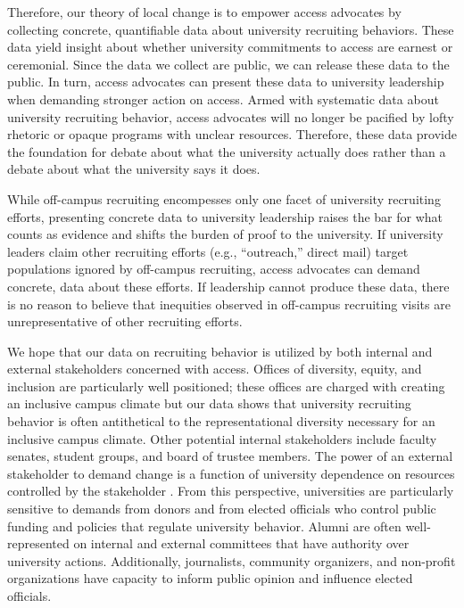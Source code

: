 \documentclass[twoside]{article}
\begin{document}
Therefore, our theory of local change is to empower access advocates by collecting concrete, quantifiable data about university recruiting behaviors. These data yield insight about whether university commitments to access are earnest or ceremonial.  Since the data we collect are public, we can release these data to the public. In turn, access advocates can present these data to university leadership when demanding stronger action on access.  Armed with systematic data about university recruiting behavior, access advocates will no longer be pacified by lofty rhetoric or opaque programs with unclear resources.  Therefore, these data provide the foundation for debate about what the university actually does rather than a debate about what the university says it does.

While off-campus recruiting encompesses only one facet of university recruiting efforts, presenting concrete data to university leadership raises the bar for what counts as evidence and shifts the burden of proof to the university. If university leaders claim other recruiting efforts (e.g., ``outreach,''  direct mail) target populations ignored by off-campus recruiting, access advocates can demand concrete, data about these efforts. If leadership cannot produce these data, there is no reason to believe that inequities observed in off-campus recruiting visits are unrepresentative of other recruiting efforts.

We hope that our data on recruiting behavior is utilized by both internal and external stakeholders concerned with access.  Offices of diversity, equity, and inclusion are particularly well positioned; these offices are charged with creating an inclusive campus climate but our data shows that university recruiting behavior is often antithetical to the representational diversity necessary for an inclusive campus climate.  Other potential internal stakeholders include faculty senates, student groups, and board of trustee members.  The power of an external stakeholder to demand change is a function of university dependence on resources controlled by the stakeholder \citep{RN959}. From this perspective, universities are particularly sensitive to demands from donors and from elected officials who control public funding and policies that regulate university behavior.  Alumni are often well-represented on internal and external committees that have authority over university actions.  Additionally, journalists, community organizers, and non-profit organizations have capacity to inform public opinion and influence elected officials.
\end{document}

